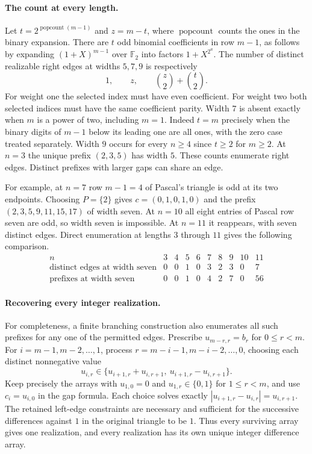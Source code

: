 \documentclass[11pt,a4paper]{article}
\begin{document}
\paragraph{The count at every length.}
Let $t=2^{\operatorname{popcount}(m-1)}$ and $z=m-t$, where $\operatorname{popcount}$ counts the ones in the binary expansion. There are $t$ odd binomial coefficients in row $m-1$, as follows by expanding $(1+X)^{m-1}$ over $\mathbb F_2$ into factors $1+X^{2^a}$. The number of distinct realizable right edges at widths $5,7,9$ is respectively
\[
 1,\qquad z,\qquad \binom{z}{2}+\binom{t}{2}.
\]
For weight one the selected index must have even coefficient. For weight two both selected indices must have the same coefficient parity. Width $7$ is absent exactly when $m$ is a power of two, including $m=1$. Indeed $t=m$ precisely when the binary digits of $m-1$ below its leading one are all ones, with the zero case treated separately. Width $9$ occurs for every $n\ge4$ since $t\ge2$ for $m\ge2$. At $n=3$ the unique prefix $(2,3,5)$ has width $5$. These counts enumerate right edges. Distinct prefixes with larger gaps can share an edge.


For example, at $n=7$ row $m-1=4$ of Pascal's triangle is odd at its two endpoints. Choosing $P=\{2\}$ gives $c=(0,1,0,1,0)$ and the prefix $(2,3,5,9,11,15,17)$ of width seven. At $n=10$ all eight entries of Pascal row seven are odd, so width seven is impossible. At $n=11$ it reappears, with seven distinct edges. Direct enumeration at lengths $3$ through $11$ gives the following comparison.
\[
\begin{array}{c|rrrrrrrrr}
 n&3&4&5&6&7&8&9&10&11\\\hline
 \text{distinct edges at width seven}&0&0&1&0&3&2&3&0&7\\
 \text{prefixes at width seven}&0&0&1&0&4&2&7&0&56
\end{array}
\]

\paragraph{Recovering every integer realization.}
For completeness, a finite branching construction also enumerates all such prefixes for any one of the permitted edges. Prescribe $u_{m-r,r}=b_r$ for $0\le r<m$. For $i=m-1,m-2,\ldots,1$, process $r=m-i-1,m-i-2,\ldots,0$, choosing each distinct nonnegative value
\[
 u_{i,r}\in\{u_{i+1,r}+u_{i,r+1},\ u_{i+1,r}-u_{i,r+1}\}.
\]
Keep precisely the arrays with $u_{1,0}=0$ and $u_{1,r}\in\{0,1\}$ for $1\le r<m$, and use $c_i=u_{i,0}$ in the gap formula. Each choice solves exactly $|u_{i+1,r}-u_{i,r}|=u_{i,r+1}$. The retained left-edge constraints are necessary and sufficient for the successive differences against $1$ in the original triangle to be $1$. Thus every surviving array gives one realization, and every realization has its own unique integer difference array.
\end{document}
